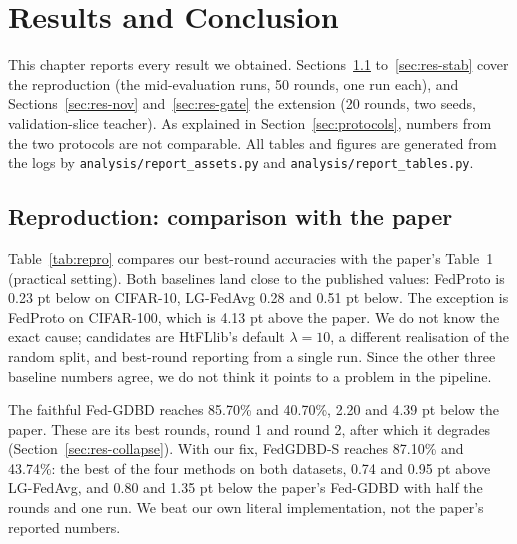 \chapter{Results and Conclusion}
\label{ch:results}

This chapter reports every result we obtained. Sections~\ref{sec:res-repro} to~\ref{sec:res-stab} cover the reproduction (the mid-evaluation runs, 50 rounds, one run each), and Sections~\ref{sec:res-nov} and~\ref{sec:res-gate} the extension (20 rounds, two seeds, validation-slice teacher). As explained in Section~\ref{sec:protocols}, numbers from the two protocols are not comparable. All tables and figures are generated from the logs by \texttt{analysis/report\_assets.py} and \texttt{analysis/report\_tables.py}.

\section{Reproduction: comparison with the paper}
\label{sec:res-repro}

Table~\ref{tab:repro} compares our best-round accuracies with the paper's Table~1 (practical setting). Both baselines land close to the published values: FedProto is 0.23 pt below on CIFAR-10, LG-FedAvg 0.28 and 0.51 pt below. The exception is FedProto on CIFAR-100, which is 4.13 pt above the paper. We do not know the exact cause; candidates are HtFLlib's default $\lambda = 10$, a different realisation of the random split, and best-round reporting from a single run. Since the other three baseline numbers agree, we do not think it points to a problem in the pipeline.

The faithful Fed-GDBD reaches 85.70\% and 40.70\%, 2.20 and 4.39 pt below the paper. These are its best rounds, round 1 and round 2, after which it degrades (Section~\ref{sec:res-collapse}). With our fix, FedGDBD-S reaches 87.10\% and 43.74\%: the best of the four methods on both datasets, 0.74 and 0.95 pt above LG-FedAvg, and 0.80 and 1.35 pt below the paper's Fed-GDBD with half the rounds and one run. We beat our own literal implementation, not the paper's reported numbers.

\begin{table}[htbp]
\centering
\caption[Reproduction: our results vs the paper]{Best-round averaged test accuracy (\%) of our runs and the paper's, practical setting ($\beta=0.1$), 20 clients, 50 rounds, one run. $\Delta$ = ours $-$ paper. For FedGDBD-S the paper column repeats the paper's Fed-GDBD. $^\dagger$ best round before the collapse (round 1 and round 2).}
\label{tab:repro}
\small
\TabReproMain
\end{table}

